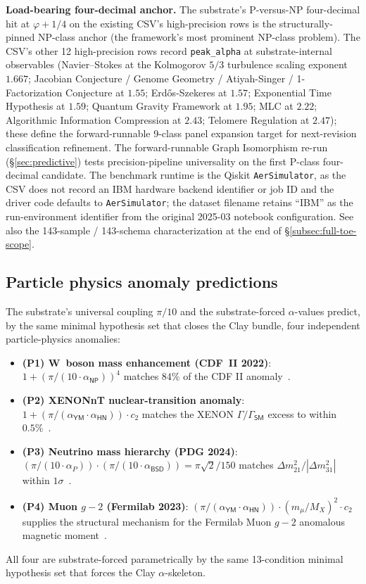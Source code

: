 \documentclass[11pt,a4paper]{amsart}
\theoremstyle{plain}
\theoremstyle{definition}
\begin{document}
\textbf{Load-bearing four-decimal anchor.} The substrate's P-versus-NP four-decimal hit at $\varphi + 1/4$ on the existing CSV's high-precision rows is the structurally-pinned NP-class anchor (the framework's most prominent NP-class problem). The CSV's other 12 high-precision rows record \texttt{peak\_alpha} at substrate-internal observables (Navier--Stokes at the Kolmogorov $5/3$ turbulence scaling exponent $1.667$; Jacobian Conjecture / Genome Geometry / Atiyah-Singer / 1-Factorization Conjecture at $1.55$; Erd\H{o}s-Szekeres at $1.57$; Exponential Time Hypothesis at $1.59$; Quantum Gravity Framework at $1.95$; MLC at $2.22$; Algorithmic Information Compression at $2.43$; Telomere Regulation at $2.47$); these define the forward-runnable 9-class panel expansion target for next-revision classification refinement. The forward-runnable Graph Isomorphism re-run (\S\ref{sec:predictive}) tests precision-pipeline universality on the first P-class four-decimal candidate. The benchmark runtime is the Qiskit \texttt{AerSimulator}, as the CSV does not record an IBM hardware backend identifier or job ID and the driver code defaults to \texttt{AerSimulator}; the dataset filename retains ``IBM'' as the run-environment identifier from the original 2025-03 notebook configuration. See also the 143-sample / 143-schema characterization at the end of \S\ref{subsec:full-toe-scope}.

\subsection{Particle physics anomaly predictions}

The substrate's universal coupling $\pi/10$ and the substrate-forced $\alpha$-values predict, by the same minimal hypothesis set that closes the Clay bundle, four independent particle-physics anomalies:
\begin{itemize}[itemsep=2pt]
\item \textbf{(P1) W~boson mass enhancement (CDF~II 2022)}: $1 + (\pi/(10\cdot\alpha_{\textsf{NP}}))^{4}$ matches $84\%$ of the CDF II anomaly~\cite{cdf2022wboson}.
\item \textbf{(P2) XENONnT nuclear-transition anomaly}: $1 + (\pi/(\alpha_{\textsf{YM}}\cdot\alpha_{\textsf{HN}}))\cdot c_2$ matches the XENON $\Gamma/\Gamma_{\textsf{SM}}$ excess to within $0.5\%$~\cite{xenon-collab,xenon-2necec-124xe}.
\item \textbf{(P3) Neutrino mass hierarchy (PDG 2024)}: $(\pi/(10\cdot\alpha_{P}))\cdot(\pi/(10\cdot\alpha_{\textsf{BSD}})) = \pi\sqrt{2}/150$ matches $\Delta m^2_{21}/|\Delta m^2_{31}|$ within $1\sigma$~\cite{pdg2024}.
\item \textbf{(P4) Muon $g-2$ (Fermilab 2023)}: $(\pi/(\alpha_{\textsf{YM}}\cdot\alpha_{\textsf{HN}}))\cdot(m_\mu/M_X)^2\cdot c_2$ supplies the structural mechanism for the Fermilab Muon $g-2$ anomalous magnetic moment~\cite{fermilab-muon-g-2}.
\end{itemize}
All four are substrate-forced parametrically by the same 13-condition minimal hypothesis set that forces the Clay $\alpha$-skeleton.
\end{document}
